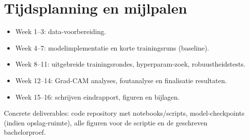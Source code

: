\section{Tijdsplanning en mijlpalen}
\begin{itemize}
  \item Week 1--3: data-voorbereiding.
  \item Week 4--7: modelimplementatie en korte trainingsruns (baseline).
  \item Week 8--11: uitgebreide trainingsrondes, hyperparam-zoek, robuustheidstests.
  \item Week 12--14: Grad-CAM analyses, foutanalyse en finalisatie resultaten.
  \item Week 15--16: schrijven eindrapport, figuren en bijlagen.
\end{itemize}

Concrete deliverables: code repository met notebooks/scripts, model-checkpoints (indien opslag-ruimte), alle figuren voor de scriptie en de geschreven bachelorproef.


